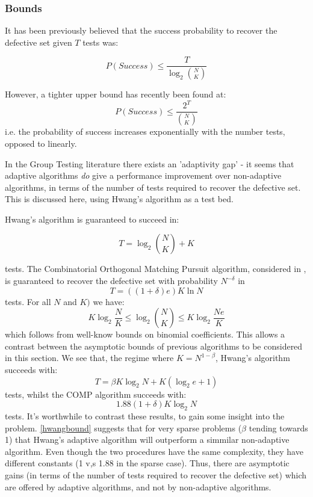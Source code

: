 \documentclass[conference]{IEEEtran}
\begin{document}
\subsubsection*{Bounds}
It has been previously believed that the success probability to recover the defective set given \(T\) tests was:

\begin{equation}
P\left(Success\right) \leq \frac{T}{\log_2{N \choose K}}
\end{equation}

However, a tighter upper bound has recently been found \cite{Aldridge2013} at:
%
\begin{equation}
P\left(Success\right) \leq \frac{2^T}{ {N \choose K} }
\end{equation}
%
i.e. the probability of success increases exponentially with the number tests, opposed to linearly. 

In the Group Testing literature there exists an 'adaptivity gap' - it seems that adaptive algorithms \textit{do} give a performance improvement over non-adaptive algorithms, in terms of the number of tests required to recover the defective set. This is discussed here, using Hwang's algorithm as a test bed.

Hwang's algorithm is guaranteed to succeed in:

\begin{equation}
T = \log_2{N\choose K} + K
\end{equation}

tests. The Combinatorial Orthogonal Matching Pursuit algorithm, considered in \cite{Chan2011}, is guaranteed to recover the defective set with probability \(N^{-\delta} \) in
%
\begin{equation}
T = \left(\left(1+\delta\right)e\right)K\ln{N}
\end{equation}
%
tests. For all \(N\) and \(K)\) we have:
%
\begin{equation}
K\log_2{\frac{N}{K}} \leq \log_2{N \choose K} \leq K \log_2{\frac{Ne}{K}}
\end{equation}
%
which follows from well-know bounds on binomial coefficients. This allows a contrast between the asymptotic bounds of previous algorithms to be considered in this section. We see that, the regime where \(K = N^{1-\beta}\), Hwang's algorithm succeeds with:
%
\begin{equation}
T = \beta K \log_2{N} + K\left(\log_2{e} + 1\right)
\end{equation}
\label{hwangbound}
%
tests, whilst the COMP algorithm succeeds with:
%
\begin{equation}
1.88\left(1+\delta\right)K\log_2{N}
\end{equation}
\label{compbound}
%
tests. It's worthwhile to contrast these results, to gain some insight into the problem. \ref{hwangbound} suggests that for very sparse problems (\(\beta\) tending towards 1) that Hwang's adaptive algorithm will outperform a simmilar non-adaptive algorithm. Even though the two procedures have the same complexity, they have different constants (1 v,s 1.88 in the sparse case). Thus, there are asymptotic gains (in terms of the number of tests required to recover the defective set) which are offered by adaptive algorithms, and not by non-adaptive algorithms.
\end{document}
